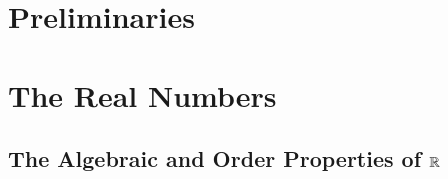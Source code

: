 \documentclass[a4paper,12pt]{article}
\begin{document}
\maketitle
{}
\newpage

\section{Preliminaries}






\newpage

\section{The Real Numbers}

\subsection{The Algebraic and Order Properties of \(\mathbb{R}\)}
\end{document}
